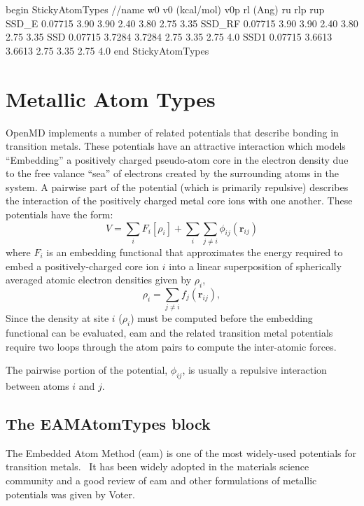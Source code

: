 \documentclass[]{book}
\begin{document}
\begin{code}[caption={[An example of a StickyAtomTypes block.] A
simple example of a StickyAtomTypes block.  Distances ($r_l$, $r_u$,
$r_{l}'$ and $r_{u}'$) are given in \AA\ and energies ($v_0, v_{0}'$)
are in units of kcal/mol. $w_0$ is unitless.},
label={sch:StickyAtomTypes}]
begin StickyAtomTypes
//name  w0      v0 (kcal/mol)   v0p     rl (Ang)  ru    rlp     rup
SSD_E   0.07715 3.90            3.90    2.40      3.80  2.75    3.35
SSD_RF  0.07715 3.90            3.90    2.40      3.80  2.75    3.35
SSD     0.07715 3.7284          3.7284  2.75      3.35  2.75    4.0
SSD1    0.07715 3.6613          3.6613  2.75      3.35  2.75    4.0
end StickyAtomTypes
\end{code}

\section{\label{section::ffMetals}Metallic Atom Types} 

{\sc OpenMD} implements a number of related potentials that describe
bonding in transition metals. These potentials have an attractive
interaction which models ``Embedding'' a positively charged
pseudo-atom core in the electron density due to the free valance
``sea'' of electrons created by the surrounding atoms in the system.
A pairwise part of the potential (which is primarily repulsive)
describes the interaction of the positively charged metal core ions
with one another.  These potentials have the form:
\begin{equation}
V  =  \sum_{i} F_{i}\left[\rho_{i}\right] + \sum_{i} \sum_{j \neq i}
\phi_{ij}(\mathbf{r}_{ij})
\end{equation}
where $F_{i} $ is an embedding functional that approximates the energy
required to embed a positively-charged core ion $i$ into a linear
superposition of spherically averaged atomic electron densities given
by $\rho_{i}$,
\begin{equation}
\rho_{i}   =  \sum_{j \neq i} f_{j}(\mathbf{r}_{ij}),
\end{equation}
Since the density at site $i$ ($\rho_i$) must be computed before the
embedding functional can be evaluated, {\sc eam} and the related
transition metal potentials require two loops through the atom pairs
to compute the inter-atomic forces.

The pairwise portion of the potential, $\phi_{ij}$, is usually a
repulsive interaction between atoms $i$ and $j$.

\subsection{\label{section:ffEAM}The EAMAtomTypes block}
The Embedded Atom Method ({\sc eam}) is one of the most widely-used
potentials for transition
metals.~\cite{Finnis84,Ercolessi88,Chen90,Qi99,Ercolessi02,Daw84,FBD86,johnson89,Lu97}
It has been widely adopted in the materials science community and a
good review of {\sc eam} and other formulations of metallic potentials
was given by Voter.\cite{Voter:95}
\end{document}
